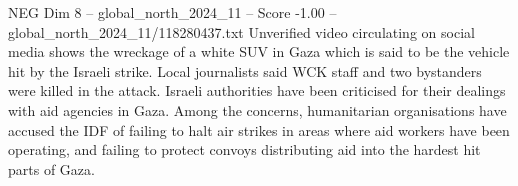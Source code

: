 \begin{textsample}{NEG Dim 8 – global\_north\_2024\_11 – Score -1.00 – global\_north\_2024\_11/118280437.txt}
Unverified video circulating on social media shows the wreckage of a white SUV in Gaza which is said to be the vehicle hit by the Israeli strike.
Local journalists said WCK staff and two bystanders were killed in the attack.
Israeli authorities have been criticised for their dealings with aid agencies in Gaza.
Among the concerns, humanitarian organisations have accused the IDF of failing to halt air strikes in areas where aid workers have been operating, and failing to protect convoys distributing aid into the hardest hit parts of Gaza.

\end{textsample}
